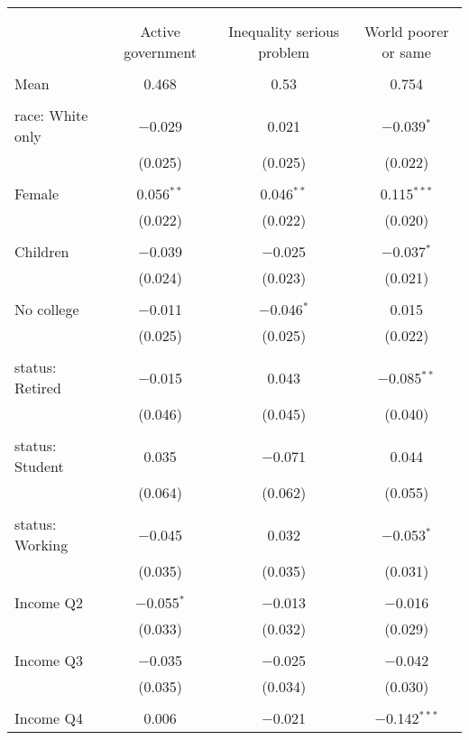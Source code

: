 
\begin{tabular}{@{\extracolsep{5pt}}lccc} 
\\[-1.8ex]\hline 
\hline \\[-1.8ex] 
\\[-1.8ex] & Active government & Inequality serious problem & World poorer or same \\ 
\hline \\[-1.8ex] 
 Mean & 0.468 & 0.53 & 0.754  \\ \hline \\[-1.8ex] race: White only & $-$0.029 & 0.021 & $-$0.039$^{*}$ \\ 
  & (0.025) & (0.025) & (0.022) \\ 
  & & & \\ 
 Female & 0.056$^{**}$ & 0.046$^{**}$ & 0.115$^{***}$ \\ 
  & (0.022) & (0.022) & (0.020) \\ 
  & & & \\ 
 Children & $-$0.039 & $-$0.025 & $-$0.037$^{*}$ \\ 
  & (0.024) & (0.023) & (0.021) \\ 
  & & & \\ 
 No college & $-$0.011 & $-$0.046$^{*}$ & 0.015 \\ 
  & (0.025) & (0.025) & (0.022) \\ 
  & & & \\ 
 status: Retired & $-$0.015 & 0.043 & $-$0.085$^{**}$ \\ 
  & (0.046) & (0.045) & (0.040) \\ 
  & & & \\ 
 status: Student & 0.035 & $-$0.071 & 0.044 \\ 
  & (0.064) & (0.062) & (0.055) \\ 
  & & & \\ 
 status: Working & $-$0.045 & 0.032 & $-$0.053$^{*}$ \\ 
  & (0.035) & (0.035) & (0.031) \\ 
  & & & \\ 
 Income Q2 & $-$0.055$^{*}$ & $-$0.013 & $-$0.016 \\ 
  & (0.033) & (0.032) & (0.029) \\ 
  & & & \\ 
 Income Q3 & $-$0.035 & $-$0.025 & $-$0.042 \\ 
  & (0.035) & (0.034) & (0.030) \\ 
  & & & \\ 
 Income Q4 & 0.006 & $-$0.021 & $-$0.142$^{***}$ \\ 

\end{tabular}
